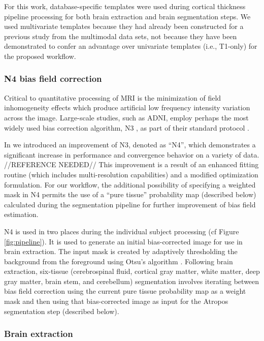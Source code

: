 For this work, database-specific templates were used during cortical thickness pipeline
processing for both brain extraction and brain segmentation steps.  We used multivariate templates
because they had already been constructed for a previous study from the multimodal data sets,
not because they have been demonstrated to confer an advantage over univariate templates (i.e., T1-only)
for the proposed workflow.

\subsubsection{N4 bias field correction}

Critical to quantitative processing of MRI is the minimization of
field inhomogeneity effects which produce artificial low frequency 
intensity variation across the image.  Large-scale studies, such
as ADNI, employ
perhaps the most widely used bias correction algorithm, N3 \citep{sled1998}, 
as part of their standard protocol \citep{boyes2008}.

In \cite{tustison2010} we introduced an improvement of N3, denoted as
``N4'', which demonstrates a significant increase in performance and convergence behavior
on a variety of data. //REFERENCE NEEDED// This improvement is a result of an enhanced
fitting routine (which includes multi-resolution capabilities) and a modified optimization 
formulation.  For our workflow, the additional possibility of specifying
a weighted mask in N4 permits the use of a ``pure tissue'' probability map 
(described below)
calculated during the segmentation pipeline for further improvement of 
bias field estimation.  

N4 is used in two places during the individual subject processing (cf Figure
\ref{fig:pipeline}).  
It is used to generate an initial bias-corrected image for use in
brain extraction.  The input mask is created by adaptively thresholding 
the background from the foreground using Otsu's algorithm \citep{otsu1979}.
Following brain extraction, six-tissue (cerebrospinal fluid, cortical gray 
matter, white matter, deep gray matter, brain stem, and cerebellum)
segmentation involves iterating
between bias field correction using the current pure tissue 
probability map as a weight mask and then using that bias-corrected image
as input for the Atropos segmentation step (described below).

\subsubsection{Brain extraction}

